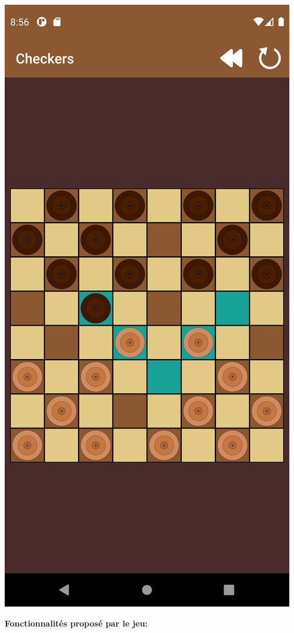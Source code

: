 \documentclass{article}
\begin{document}
\begin{center}
  \includegraphics[scale=0.1]{partie_1.png}
\end{center}

\textbf{Fonctionnalités proposé par le jeu:}
\end{document}
